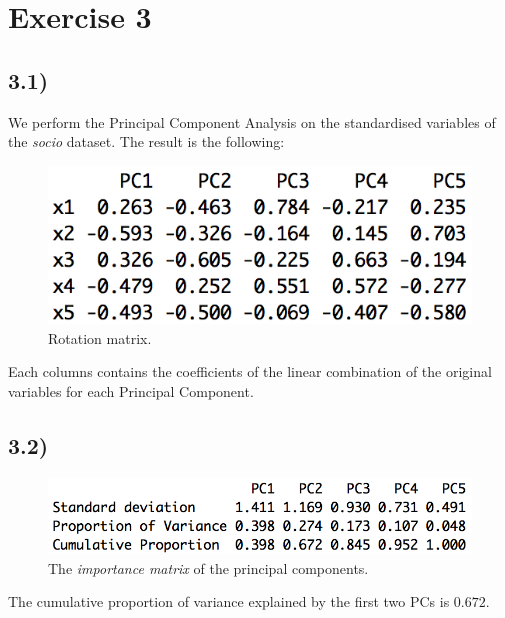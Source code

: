 \documentclass[a4paper,11pt,oneside]{report}
\begin{document}
\newpage
\section*{Exercise 3}
\subsection*{3.1)}
	We perform the Principal Component Analysis on the standardised variables of the \textit{socio} dataset. The result is the following:
	\begin{figure}[H]
	\centering
	\includegraphics[scale = 0.8]{PCA_socio.png}
	\caption{Rotation matrix.}
	\label{fig:rot}
	\end{figure}
	Each columns contains the coefficients of the linear combination of the original variables for each Principal Component.

\subsection*{3.2)}
	\begin{figure}[H]
	\centering
	\includegraphics[scale = 0.8]{importance_pca.png}
	\caption{The \textit{importance matrix} of the principal components.}
	\end{figure}
	The cumulative proportion of variance explained by the first two PCs is $0.672$.
\end{document}
